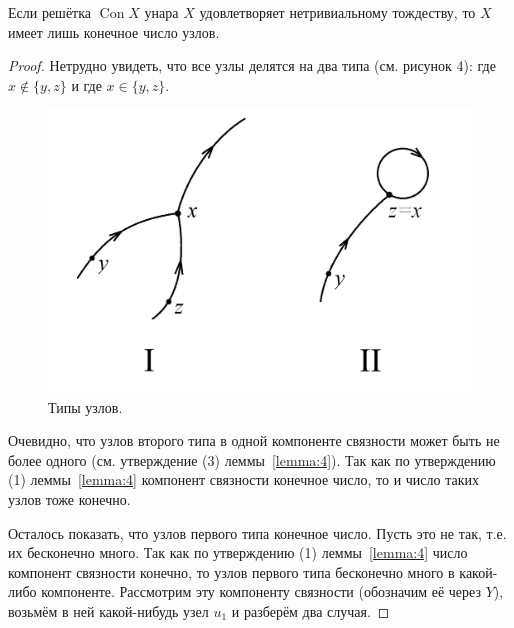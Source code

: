 \documentclass[11pt,twoside,final
]{article}
\def\Con{\operatorname{Con}}
\begin{document}
\begin{lemma} \label{lemma:7}
	Если решётка $\Con X$ унара $X$ удовлетворяет нетривиальному тождеству, то $X$ имеет лишь конечное число узлов.
\end{lemma}
\begin{proof}
	Нетрудно увидеть, что все узлы делятся на два типа (см. рисунок 4): где $x \notin \{ y, z \}$ и где $x \in \{ y, z \}$.
	\begin{figure}[ht!]
		\centering
		\includegraphics[scale=0.4]{img/uzly.png}
		\caption{Типы узлов.}
		\label{fig:uzly}
	\end{figure}
	Очевидно, что узлов второго типа в одной компоненте связности может быть не более одного (см. утверждение (3) леммы~\ref{lemma:4}).
	Так как по утверждению (1) леммы~\ref{lemma:4} компонент связности конечное число, то и число таких узлов тоже конечно.
	
	Осталось показать, что узлов первого типа конечное число.
	Пусть это не так, т.е. их бесконечно много.
	Так как по утверждению (1) леммы~\ref{lemma:4} число компонент связности конечно, то узлов первого типа бесконечно много в какой-либо компоненте.
	Рассмотрим эту компоненту связности (обозначим её через $Y$), возьмём в ней какой-нибудь узел $u_{1}$ и разберём два случая.
	

\end{proof}
\end{document}
